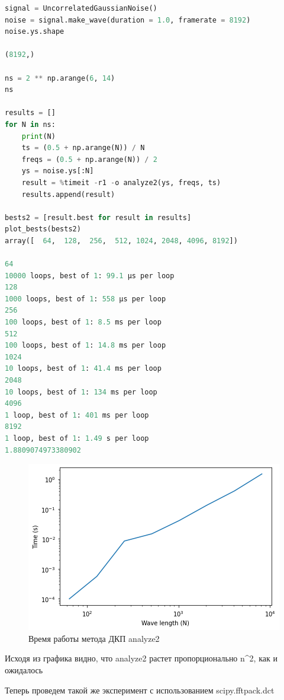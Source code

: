 \begin{lstlisting}[language=Python]
signal = UncorrelatedGaussianNoise()
noise = signal.make_wave(duration = 1.0, framerate = 8192)
noise.ys.shape

(8192,)

ns = 2 ** np.arange(6, 14)
ns

results = []
for N in ns:
    print(N)
    ts = (0.5 + np.arange(N)) / N
    freqs = (0.5 + np.arange(N)) / 2
    ys = noise.ys[:N]
    result = %timeit -r1 -o analyze2(ys, freqs, ts)
    results.append(result)

bests2 = [result.best for result in results]
plot_bests(bests2)
array([  64,  128,  256,  512, 1024, 2048, 4096, 8192])

64
10000 loops, best of 1: 99.1 µs per loop
128
1000 loops, best of 1: 558 µs per loop
256
100 loops, best of 1: 8.5 ms per loop
512
100 loops, best of 1: 14.8 ms per loop
1024
10 loops, best of 1: 41.4 ms per loop
2048
10 loops, best of 1: 134 ms per loop
4096
1 loop, best of 1: 401 ms per loop
8192
1 loop, best of 1: 1.49 s per loop
1.8809074973380902
\end{lstlisting}

\begin{figure}[H]
	\begin{center}
		\includegraphics[scale=1]{fig/lab06/lab06_02.png}
		\caption{Время работы метода ДКП analyze2}
	\end{center}
\end{figure}

Исходя из графика видно, что analyze2 растет пропорционально n^2, как и ожидалось

Теперь проведем такой же эксперимент с использованием scipy.fftpack.dct

